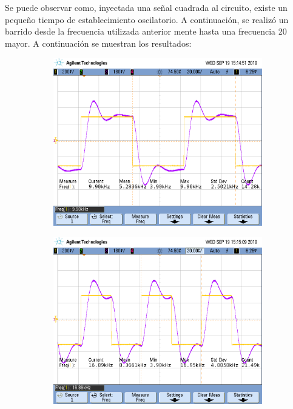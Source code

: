 Se puede observar como, inyectada una señal cuadrada al circuito, existe un pequeño tiempo de establecimiento oscilatorio. A continuación, se realizó un barrido desde la frecuencia utilizada anterior mente hasta una frecuencia 20 mayor. A continuación se muestran los resultados:

\begin{figure}[H]
\centering
\begin{subfigure}
  \centering
  \includegraphics[width=.8\textwidth]{Ejercicio2/Mediciones/A/waveform3.png}  
\end{subfigure}
\begin{subfigure}
  \centering
  \includegraphics[width=.8\textwidth]{Ejercicio2/Mediciones/A/waveform4.png}  
\end{subfigure}
\begin{subfigure}
  \centering

\end{subfigure}
\end{figure}
